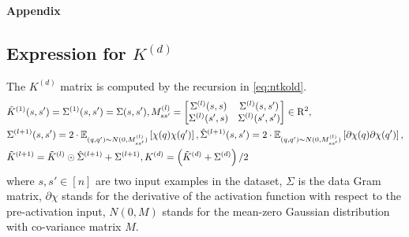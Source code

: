 \newpage
\begin{center}
{\Large{\textbf{Appendix}}}
\end{center}

\begin{appendix}
\section{Expression for $K^{(d)}$}\label{sec:kd}
The $K^{(d)}$ matrix is computed by the recursion in \eqref{eq:ntkold}.
\begin{align}\label{eq:ntkold}
&\tilde{K}^{(1)}(s,s')=\Sigma^{(1)}(s,s')=\Sigma(s,s'), M^{(l)}_{ss'}=\left[\begin{matrix}\Sigma^{(l)}(s,s) & \Sigma^{(l)}(s,s')\\ \Sigma^{(l)}(s',s) & \Sigma^{(l)}(s',s')\end{matrix}\right]\in \mathrm{R}^2,\nonumber\\
&\Sigma^{(l+1)}(s,s')= 2\cdot\mathbb{E}_{(q,q')\sim N(0,M_{ss'}^{(l)})} \left[\chi(q)\chi(q')\right], \hat{\Sigma}^{(l+1)}(s,s')= 2\cdot\mathbb{E}_{(q,q')\sim N(0,M_{ss'}^{(l)})}\left[\partial\chi(q)\partial{\chi}(q')\right],\nonumber\\
&\tilde{K}^{(l+1)}=\tilde{K}^{(l)}\odot \hat{\Sigma}^{(l+1)}+\Sigma^{(l+1)}, K^{(d)}=\left(\tilde{K}^{(d)}+\Sigma^{(d)}\right)/2
\end{align}
where $s,s'\in[n]$ are two input examples in the dataset, $\Sigma$ is the data Gram matrix, $\partial{\chi}$ stands for the derivative of the activation function with respect to the pre-activation input, $N(0,M)$ stands for the mean-zero Gaussian distribution with co-variance matrix $M$.




\end{appendix}
